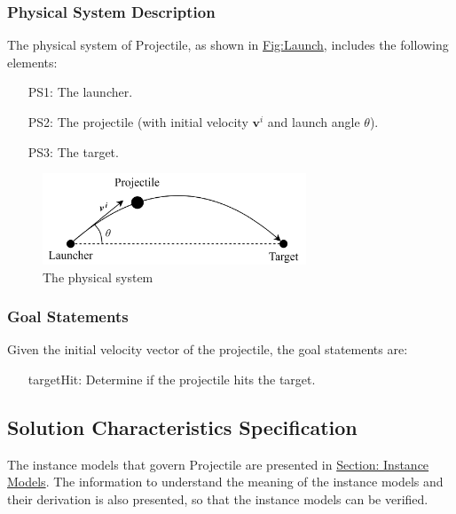 \documentclass[12pt]{article}
\begin{document}
\subsubsection{Physical System Description}
\label{Sec:PhysSyst}
The physical system of Projectile, as shown in \hyperref[Figure:Launch]{Fig:Launch}, includes the following elements:
\begin{itemize}
\item[PS1:]The launcher.
\item[PS2:]The projectile (with initial velocity ${\mathbf{v}^{i}}$ and launch angle $θ$).
\item[PS3:]The target.
\end{itemize}
\begin{figure}
\begin{center}
\includegraphics[width=0.7\textwidth]{../../../datafiles/Projectile/Launch.jpg}
\caption{The physical system}
\label{Figure:Launch}
\end{center}
\end{figure}
\subsubsection{Goal Statements}
\label{Sec:GoalStmt}
Given the initial velocity vector of the projectile, the goal statements are:
\begin{itemize}
\item[targetHit:\phantomsection\label{targetHit}]Determine if the projectile hits the target.
\end{itemize}
\subsection{Solution Characteristics Specification}
\label{Sec:SolCharSpec}
The instance models that govern Projectile are presented in \hyperref[Sec:IMs]{Section: Instance Models}. The information to understand the meaning of the instance models and their derivation is also presented, so that the instance models can be verified.
\end{document}
